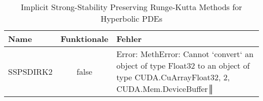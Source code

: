 \begin{table}[]
    \centering

    \begin{tabular}{p{5cm}|c|p{5cm}}
        Name & Funktionale & Fehler \\
        \hline\hline
        SSPSDIRK2 & false & Error: MethError: Cannot `convert` an object of type Float32 to an object of type CUDA.CuArray{Float32, 2, CUDA.Mem.DeviceBuffer}║ \\        
    \end{tabular}
    \caption{Implicit Strong-Stability Preserving Runge-Kutta Methods for Hyperbolic PDEs}
    \label{tab:my_label}
\end{table}
